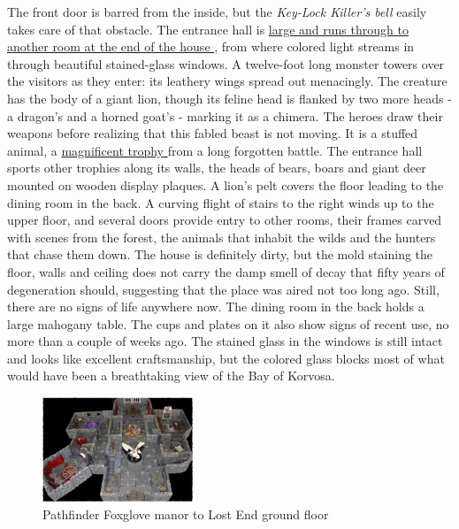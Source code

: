 The front door is barred from the inside, but the {\itshape Key-Lock Killer's bell} easily takes care of that obstacle. The entrance hall is \hyperref[fig:Pathfinder-Foxglove-manor-to-Lost-End-ground-floor-513919727]{ large and runs through to another room at the end of the house } , from where colored light streams in through beautiful stained-glass windows. A twelve-foot long monster towers over the visitors as they enter: its leathery wings spread out menacingly. The creature has the body of a giant lion, though its feline head is flanked by two more heads - a dragon's and a horned goat's - marking it as a chimera. The heroes draw their weapons before realizing that this fabled beast is not moving. It is a stuffed animal, a \hyperref[fig:Pathfinder-Foxglove-manor-to-Lost-End-chimera-513923128]{ magnificent trophy } from a long forgotten battle. The entrance hall sports other trophies along its walls, the heads of bears, boars and giant deer mounted on wooden display plaques. A lion's pelt covers the floor leading to the dining room in the back. A curving flight of stairs to the right winds up to the upper floor, and several doors provide entry to other rooms, their frames carved with scenes from the forest, the animals that inhabit the wilds and the hunters that chase them down. The house is definitely dirty, but the mold staining the floor, walls and ceiling does not carry the damp smell of decay that fifty years of degeneration should, suggesting that the place was aired not too long ago. Still, there are no signs of life anywhere now. The dining room in the back holds a large mahogany table. The cups and plates on it also show signs of recent use, no more than a couple of weeks ago. The stained glass in the windows is still intact and looks like excellent craftsmanship, but the colored glass blocks most of what would have been a breathtaking view of the Bay of Korvosa. \\

\begin{figure}[h]
	\centering
	\includegraphics[width=0.4\textwidth]{images/Pathfinder-Foxglove-manor-to-Lost-End-ground-floor-513919727_mod.jpg}
	\caption{Pathfinder Foxglove manor to Lost End ground floor}
	\label{fig:Pathfinder-Foxglove-manor-to-Lost-End-ground-floor-513919727}
\end{figure}

